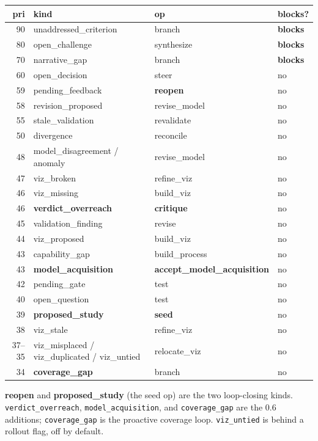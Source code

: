 \documentclass[11pt]{article}
\newcommand{\code}[1]{\texttt{\small #1}}
\newcommand{\blocks}{\textcolor{bad}{\textbf{blocks}}}
\newcommand{\nob}{\textcolor{muted}{no}}
\begin{document}
\begin{center}\small
\begin{tabular}{@{}rlll@{}}
\toprule
\textbf{pri} & \textbf{kind} & \textbf{op} & \textbf{blocks?}\\
\midrule
90 & \cellcolor{bad!12}unaddressed\_criterion & branch       & \blocks\\
80 & \cellcolor{bad!12}open\_challenge         & synthesize   & \blocks\\
70 & \cellcolor{bad!12}narrative\_gap          & branch       & \blocks\\
60 & open\_decision        & steer         & \nob\\
59 & pending\_feedback     & \textbf{reopen} & \nob\\
58 & revision\_proposed    & revise\_model & \nob\\
55 & stale\_validation     & revalidate    & \nob\\
50 & divergence            & reconcile     & \nob\\
48 & model\_disagreement / anomaly & revise\_model & \nob\\
47 & viz\_broken           & refine\_viz   & \nob\\
46 & viz\_missing          & build\_viz    & \nob\\
46 & \textbf{verdict\_overreach} & \textbf{critique} & \nob\\
45 & validation\_finding   & revise        & \nob\\
44 & viz\_proposed         & build\_viz    & \nob\\
43 & capability\_gap       & build\_process & \nob\\
43 & \textbf{model\_acquisition} & \textbf{accept\_model\_acquisition} & \nob\\
42 & pending\_gate         & test          & \nob\\
40 & open\_question        & test          & \nob\\
39 & \textbf{proposed\_study} & \textbf{seed} & \nob\\
38 & viz\_stale            & refine\_viz   & \nob\\
37--35 & viz\_misplaced / viz\_duplicated / viz\_untied & relocate\_viz & \nob\\
34 & \textbf{coverage\_gap} & branch       & \nob\\
\bottomrule
\end{tabular}
\end{center}
{\footnotesize \textbf{reopen} and \textbf{proposed\_study} (the seed op) are the two
loop-closing kinds. \code{verdict\_overreach}, \code{model\_acquisition}, and \code{coverage\_gap}
are the 0.6 additions; \code{coverage\_gap} is the proactive coverage loop. \code{viz\_untied} is
behind a rollout flag, off by default.}
\end{document}
